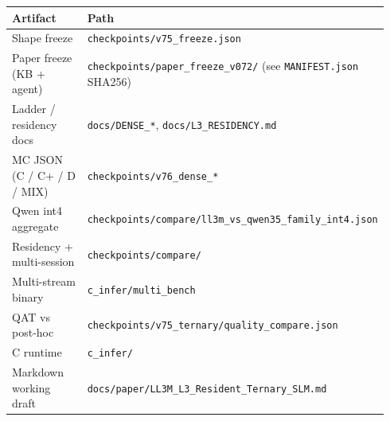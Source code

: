 \documentclass[11pt,a4paper]{article}
\begin{document}
{\small
\setlength{\tabcolsep}{3pt}
\begin{tabular}{@{}p{0.32\linewidth}p{0.62\linewidth}@{}}
\toprule
Artifact & Path \\
\midrule
Shape freeze & \texttt{checkpoints/v75\_freeze.json} \\
Paper freeze (KB + agent) & \texttt{checkpoints/paper\_freeze\_v072/} (see \texttt{MANIFEST.json} SHA256) \\
Ladder / residency docs & \texttt{docs/DENSE\_*}, \texttt{docs/L3\_RESIDENCY.md} \\
MC JSON (C / C+ / D / MIX) & \texttt{checkpoints/v76\_dense\_*} \\
Qwen int4 aggregate & \texttt{checkpoints/compare/ll3m\_vs\_qwen35\_family\_int4.json} \\
Residency + multi-session & \texttt{checkpoints/compare/} \\
Multi-stream binary & \texttt{c\_infer/multi\_bench} \\
QAT vs post-hoc & \texttt{checkpoints/v75\_ternary/quality\_compare.json} \\
C runtime & \texttt{c\_infer/} \\
Markdown working draft & \texttt{docs/paper/LL3M\_L3\_Resident\_Ternary\_SLM.md} \\
\bottomrule
\end{tabular}
}



\end{document}
